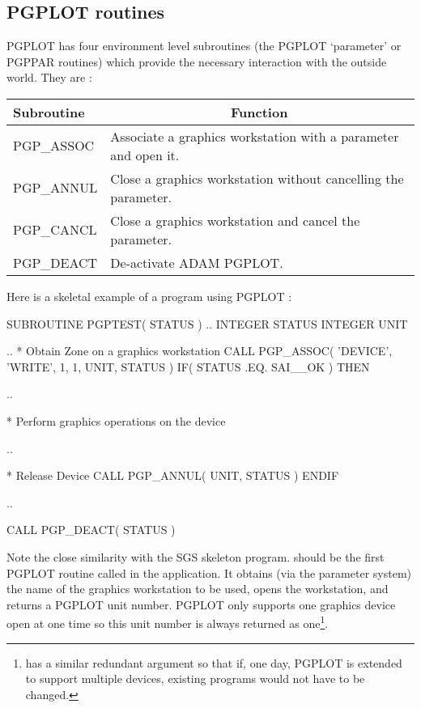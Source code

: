 \documentclass[twoside,11pt,nolof]{starlink}
\begin{document}
\subsection{PGPLOT routines\label{pgplot}}

PGPLOT has four environment level subroutines (the PGPLOT `parameter' or PGPPAR
routines) which provide the necessary interaction with the outside world.
They are :

\begin{center}
\begin{tabular}{||l|l||} \hline
Subroutine & \multicolumn{1}{c||}{Function} \\ \hline
PGP\_ASSOC  & Associate a graphics workstation with a parameter and open it.\\
PGP\_ANNUL  & Close a graphics workstation without cancelling the parameter.\\
PGP\_CANCL  & Close a graphics workstation and cancel the parameter.\\
PGP\_DEACT  & De-activate ADAM PGPLOT.\\ \hline
\end{tabular}
\end{center}

Here is a skeletal example of a program using PGPLOT :
\begin{small}
\begin{terminalv}
      SUBROUTINE PGPTEST( STATUS )
      ..
      INTEGER STATUS
      INTEGER UNIT

      ..
*    Obtain Zone on a graphics workstation
      CALL PGP_ASSOC( 'DEVICE', 'WRITE', 1, 1, UNIT, STATUS )
      IF( STATUS .EQ. SAI__OK ) THEN

         ..

*       Perform graphics operations on the device

         ..

*       Release Device
         CALL PGP_ANNUL( UNIT, STATUS )
      ENDIF

      ..

      CALL PGP_DEACT( STATUS )
\end{terminalv}
\end{small}

Note the close similarity with the SGS skeleton program.
 should be
the first PGPLOT routine called in the application. It obtains (via the
parameter system) the name of the graphics workstation  to be used, opens the
workstation, and returns a PGPLOT unit number. PGPLOT only supports one
graphics device open at one time so this unit number is always returned as
one\footnote{ has a similar redundant argument so that if, one day,
PGPLOT is extended to support multiple devices, existing programs would not
have to be changed.}.
\end{document}
